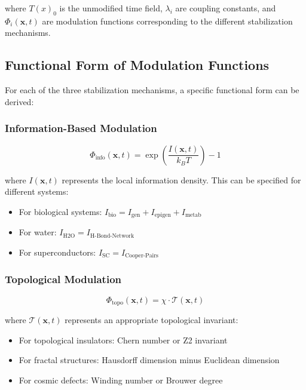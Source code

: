 \documentclass[12pt,a4paper]{article}
\newcommand{\Tfield}{T(x)}
\begin{document}
	where $\Tfield_0$ is the unmodified time field, $\lambda_i$ are coupling constants, and $\Phi_i(\mathbf{x}, t)$ are modulation functions corresponding to the different stabilization mechanisms.
	
	\subsection{Functional Form of Modulation Functions}
	
	For each of the three stabilization mechanisms, a specific functional form can be derived:
	
	\subsubsection{Information-Based Modulation}
	
	\begin{equation}
		\Phi_{\text{info}}(\mathbf{x}, t) = \exp\left(\frac{I(\mathbf{x}, t)}{k_B T}\right) - 1
	\end{equation}
	
	where $I(\mathbf{x}, t)$ represents the local information density. This can be specified for different systems:
	
	\begin{itemize}
		\item For biological systems: $I_{\text{bio}} = I_{\text{gen}} + I_{\text{epigen}} + I_{\text{metab}}$
		\item For water: $I_{\text{H2O}} = I_{\text{H-Bond-Network}}$
		\item For superconductors: $I_{\text{SC}} = I_{\text{Cooper-Pairs}}$
	\end{itemize}
	
	\subsubsection{Topological Modulation}
	
	\begin{equation}
		\Phi_{\text{topo}}(\mathbf{x}, t) = \chi \cdot \mathcal{T}(\mathbf{x}, t)
	\end{equation}
	
	where $\mathcal{T}(\mathbf{x}, t)$ represents an appropriate topological invariant:
	
	\begin{itemize}
		\item For topological insulators: Chern number or Z2 invariant
		\item For fractal structures: Hausdorff dimension minus Euclidean dimension
		\item For cosmic defects: Winding number or Brouwer degree
	\end{itemize}
	
\end{document}
